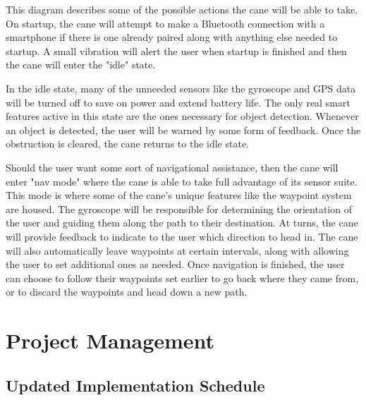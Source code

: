 \documentclass[letterpaper,12pt]{article}
\begin{document}

\medskip

This diagram describes some of the possible actions the cane will be able to take. On startup, the cane will attempt to make a Bluetooth connection with a smartphone if there is one already paired along with anything else needed to startup. A small vibration will alert the user when startup is finished and then the cane will enter the "idle" state. \par

In the idle state, many of the unneeded sensors like the gyroscope and GPS data will be turned off to save on power and extend battery life. The only real smart features active in this state are the ones necessary for object detection. Whenever an object is detected, the user will be warned by some form of feedback. Once the obstruction is cleared, the cane returns to the idle state. \par 

Should the user want some sort of navigational assistance, then the cane will enter "nav mode" where the cane is able to take full advantage of its sensor suite. This mode is where some of the cane's unique features like the waypoint system are housed. The gyroscope will be responsible for determining the orientation of the user and guiding them along the path to their destination. At turns, the cane will provide feedback to indicate to the user which direction to head in. The cane will also automatically leave waypoints at certain intervals, along with allowing the user to set additional ones as needed. Once navigation is finished, the user can choose to follow their waypoints set earlier to go back where they came from, or to discard the waypoints and head down a new path. \par



\section{Project Management}


\subsection{Updated Implementation Schedule}
\end{document}
